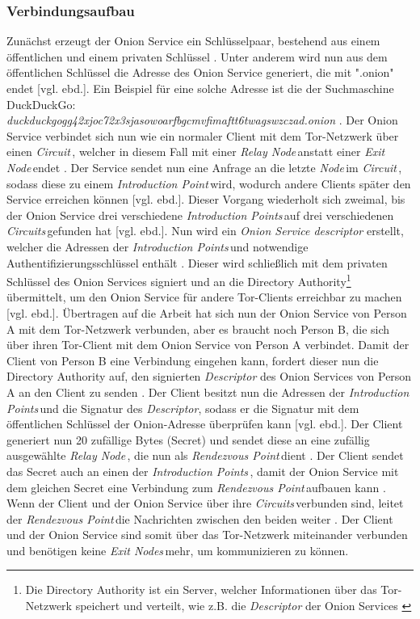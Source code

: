 \documentclass[a4paper,ngerman, headheight=28pt,12pt]{scrartcl}
\newcommand{\vcite}[1]{\cite[vgl.][]{#1}}
\newcommand{\vebd}{[vgl. ebd.]}
\newcommand{\relayn}{\textit{Relay Node\,}}
\newcommand{\exitn}{\textit{Exit Node\,}}
\newcommand{\exitns}{\textit{Exit Nodes\,}}
\newcommand{\node}{\textit{Node\,}}
\newcommand{\circuit}{\textit{Circuit\,}}
\newcommand{\circuits}{\textit{Circuits\,}}
\newcommand{\introp}{\textit{Introduction Point\,}}
\newcommand{\introps}{\textit{Introduction Points\,}}
\newcommand{\renp}{\textit{Rendezvous Point\,}}
\begin{document}
\subsubsection{Verbindungsaufbau}
Zunächst erzeugt der Onion Service ein Schlüsselpaar, bestehend aus einem öffentlichen und einem privaten Schlüssel \vcite{GeeksOnionService}. Unter anderem wird nun aus dem öffentlichen Schlüssel die Adresse des Onion Service generiert, die mit ".onion" endet \vebd. Ein Beispiel für eine solche Adresse ist die der Suchmaschine DuckDuckGo: \\
\textit{duckduckgogg42xjoc72x3sjasowoarfbgcmvfimaftt6twagswzczad.onion} \vcite{DuckDuckGoLink}.
Der Onion Service verbindet sich nun wie ein normaler Client mit dem Tor-Netzwerk über einen \circuit, welcher in diesem Fall mit einer \relayn anstatt einer \exitn endet \vcite{TorOnionService}.
Der Service sendet nun eine Anfrage an die letzte \node im \circuit, sodass diese zu einem \introp wird, wodurch andere Clients später den Service erreichen können \vebd. Dieser Vorgang wiederholt sich zweimal, bis der Onion Service drei verschiedene \introps auf drei verschiedenen \circuits gefunden hat \vebd. Nun wird ein \textit{Onion Service descriptor} erstellt, welcher die Adressen der \introps und notwendige Authentifizierungsschlüssel enthält \vcite{TorSpecDirectoryInf, TorSpecDerivingKeys}. Dieser wird schließlich mit dem privaten Schlüssel des Onion Services signiert und an die Directory Authority\footnote{Die Directory Authority ist ein Server, welcher Informationen über das Tor-Netzwerk speichert und verteilt, wie z.B. die \textit{Descriptor} der Onion Services \vcite{TorDirectoryAuthority}} übermittelt, um den Onion Service für andere Tor-Clients erreichbar zu machen \vebd. Übertragen auf die Arbeit hat sich nun der Onion Service von Person A mit dem Tor-Netzwerk verbunden, aber es braucht noch Person B, die sich über ihren Tor-Client mit dem Onion Service von Person A verbindet.
Damit der Client von Person B eine Verbindung eingehen kann, fordert dieser nun die Directory Authority auf, den signierten \textit{Descriptor} des Onion Services von Person A an den Client zu senden \vcite{TorStructure}.
Der Client besitzt nun die Adressen der \introps und die Signatur des \textit{Descriptor}, sodass er die Signatur mit dem öffentlichen Schlüssel der Onion-Adresse überprüfen kann \vebd. Der Client generiert nun 20 zufällige Bytes (Secret) und sendet diese an eine zufällig ausgewählte \relayn, die nun als \renp dient \vcite{TorSpecRendezvous}. Der Client sendet das Secret auch an einen der \introps, damit der Onion Service mit dem gleichen Secret eine Verbindung zum \renp aufbauen kann \vcite{TorSpecIntroP}. Wenn der Client und der Onion Service über ihre \circuits verbunden sind, leitet der \renp die Nachrichten zwischen den beiden weiter \vcite{TorSpecRendezvous}. Der Client und der Onion Service sind somit über das Tor-Netzwerk miteinander verbunden und benötigen keine \exitns mehr, um kommunizieren zu können.
\end{document}
